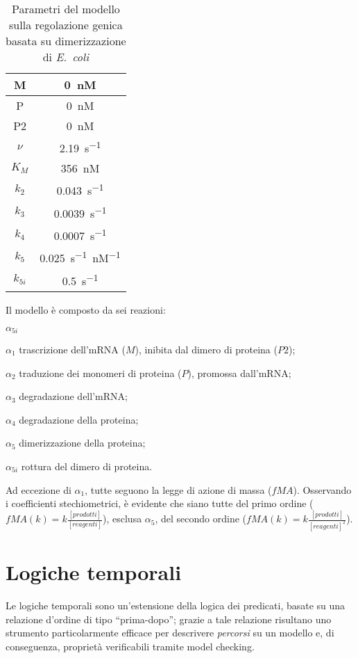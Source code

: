 				\begin{table}[H]
					\centering
					\begin{tabular}{| c | c |}
						\hline
						M & \SI{0}{nM}\\
						\hline
						P & \SI{0}{nM}\\
						\hline
						P2 & \SI{0}{nM}\\
						\hline
						$\nu$ & \SI{2.19}{s^{-1}}\\
						\hline
						$K_M$ & \SI{356}{nM}\\
						\hline
						$k_2$ & \SI{0.043}{s^{-1}}\\
						\hline
						$k_3$ & \SI{0.0039}{s^{-1}}\\
						\hline
						$k_4$ & \SI{0.0007}{s^{-1}}\\
						\hline
						$k_5$ & \SI{0.025}{s^{-1} nM^{-1}}\\
						\hline
						$k_{5i}$ & \SI{0.5}{s^{-1}}\\
						\hline
					\end{tabular}
					\caption{Parametri del modello sulla regolazione genica basata su dimerizzazione di \emph{E.\ coli}}
				\end{table}
		Il modello \`e composto da sei reazioni:
		\begin{labeling}{$\alpha_{5i}$}
			\item [$\alpha_1$] trascrizione dell'mRNA ($M$), inibita dal dimero di proteina ($P2$);
			\item [$\alpha_2$] traduzione dei monomeri di proteina ($P$), promossa dall'mRNA;
			\item [$\alpha_3$] degradazione dell'mRNA;
			\item [$\alpha_4$] degradazione della proteina;
			\item [$\alpha_5$] dimerizzazione della proteina;
			\item [$\alpha_{5i}$] rottura del dimero di proteina.
		\end{labeling}
		Ad eccezione di $\alpha_1$, tutte seguono la legge di azione di massa ($fMA$). Osservando i coefficienti stechiometrici, \`e evidente che siano tutte del primo ordine ($fMA(k) = k \frac{[prodotti]}{[reagenti]}$), esclusa $\alpha_5$, del secondo ordine ($fMA(k) = k \frac{[prodotti]}{[reagenti]^2}$).
		
	
	\section{Logiche temporali}\label{sez:logiche}
	Le logiche temporali sono un'estensione della logica dei predicati, basate su una relazione d'ordine di tipo ``prima-dopo''; grazie a tale relazione risultano uno strumento particolarmente efficace per descrivere \emph{percorsi} su un modello e, di conseguenza, propriet\`a verificabili tramite model checking.
	

